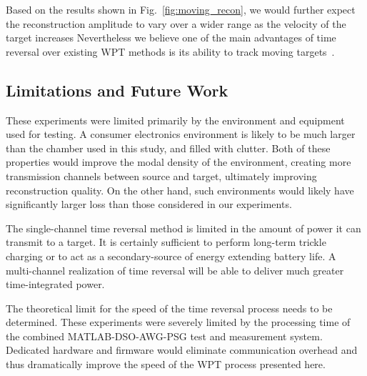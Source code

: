 \documentclass[conference]{IEEEtran}
\begin{document}
Based on the results shown in Fig.~\ref{fig:moving_recon}, we would further
expect the reconstruction amplitude to vary over a wider range as the velocity
of the target increases
%
Nevertheless we believe one of the main advantages of time reversal over
existing WPT methods is its ability to track moving
targets~\cite{fink,nltr-wave-chaotic}.

\subsection{Limitations and Future Work}
\label{sec:limitations}


These experiments were limited primarily by the environment and equipment used
for testing.
%
A consumer electronics environment is likely to be much larger than the chamber
used in this study, and filled with clutter.
%
Both of these properties would improve the modal density of the environment,
creating more transmission channels between source and target, ultimately
improving reconstruction quality.
%
On the other hand, such environments would likely have significantly larger loss
than those considered in our experiments.






The single-channel time reversal method is limited in the amount of power it can
transmit to a target.
%
It is certainly sufficient to perform long-term trickle charging or to act as a
secondary-source of energy extending battery life.
%
A multi-channel realization of time reversal will be able to deliver much
greater time-integrated power.



The theoretical limit for the speed of the time reversal process needs to be
determined.
%
These experiments were severely limited by the processing time of the combined
MATLAB-DSO-AWG-PSG test and measurement system.
%
Dedicated hardware and firmware would eliminate communication overhead and thus
dramatically improve the speed of the WPT process presented here.
\end{document}
